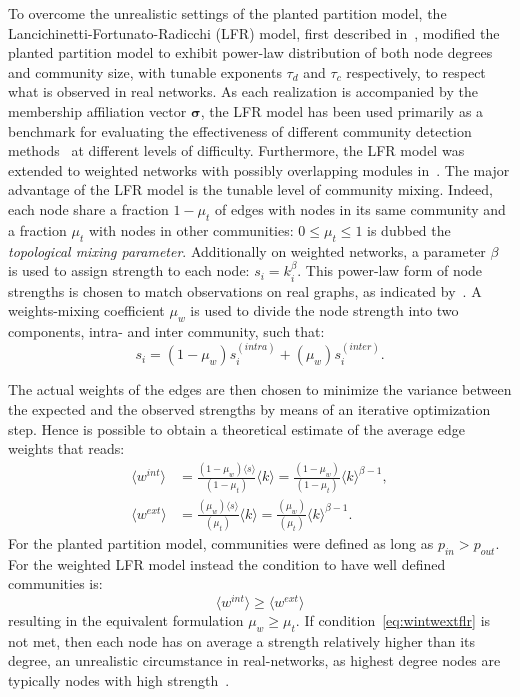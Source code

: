 To overcome the unrealistic settings of the planted partition model, the Lancichinetti\hyp{}Fortunato\hyp{}Radicchi (LFR) model, first described in~\cite{lancichinetti2008}, modified the planted partition model to exhibit power-law distribution of both node degrees and community size, with tunable exponents $\tau_d$ and $\tau_c$ respectively, to respect what is observed in real networks.
As each realization is accompanied by the membership affiliation vector $\boldsymbol \sigma$, the LFR model has been used primarily as a benchmark for evaluating the effectiveness of different community detection methods~\cite{fortunato2010,lancichinetti2009} at different levels of difficulty.
Furthermore, the LFR model was extended to weighted networks with possibly overlapping modules in~\cite{lancichinetti2009a}.
The major advantage of the LFR model is the tunable level of community mixing.
Indeed, each node share a fraction $1-\mu_t$ of edges with nodes in its same community and a fraction $\mu_t$ with nodes in other communities: $0 \leq \mu_t \leq 1$ is dubbed the \emph{topological mixing parameter}.
Additionally on weighted networks, a parameter $\beta$ is used to assign strength to each node: $s_i=k_i^\beta$.
This power-law form of node strengths is chosen to match observations on real graphs, as indicated by~\cite{barrat2004}.
A weights-mixing coefficient $\mu_w$ is used to divide the node strength into two components, intra- and inter community, such that:
$$s_i = (1-\mu_w)s_i^{(intra)} + (\mu_w)s_i^{(inter)}.$$

The actual weights of the edges are then chosen to minimize the variance between the expected and the observed strengths by means of an iterative optimization step.
Hence is possible to obtain a theoretical estimate of the average edge weights that reads:
\begin{align}
\langle  w^{int} \rangle &= \frac{(1-\mu_w)\langle  s\rangle }{(1-\mu_t)}\langle  k\rangle = \frac{(1-\mu_w)}{(1-\mu_t)}\langle  k \rangle ^{\beta-1}, \\
\langle  w^{ext} \rangle &= \frac{(\mu_w)\langle  s\rangle }{(\mu_t)}\langle  k\rangle = \frac{(\mu_w)}{(\mu_t)}\langle  k \rangle ^{\beta-1}.
\end{align}
For the planted partition model, communities were defined as long as $p_{in}>p_{out}$. For the weighted LFR model instead the condition to have well defined communities is:
\begin{equation}\label{eq:wintwextflr}
\langle  w^{int} \rangle \geq \langle  w^{ext} \rangle 
\end{equation}
resulting in the equivalent formulation $\mu_w  \geq \mu_t$.
If condition~\ref{eq:wintwextflr} is not met, then each node has on average a strength relatively higher than its degree, an unrealistic circumstance in real-networks, as highest degree nodes are typically nodes with high strength~\cite{barrat2004}.

